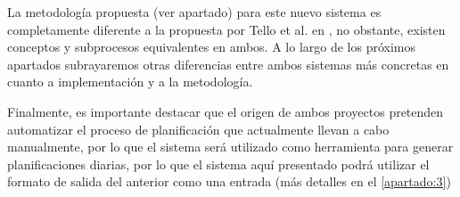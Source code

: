 La metodología propuesta (ver apartado) para este nuevo sistema es completamente diferente a la propuesta por Tello et 
al. en \cite{articulo1}, no obstante, existen conceptos y subprocesos equivalentes en ambos. A lo largo de los próximos 
apartados subrayaremos otras diferencias entre ambos sistemas más concretas en cuanto a implementación y a la 
metodología.

Finalmente, es importante destacar que el origen de ambos proyectos pretenden automatizar el proceso de planificación 
que actualmente llevan a cabo manualmente, por lo que el sistema \legacy{} será utilizado como herramienta para generar 
planificaciones diarias, por lo que el sistema aquí presentado podrá utilizar el formato de salida del anterior como 
una entrada (más detalles en el \autoref{apartado:3}) 


